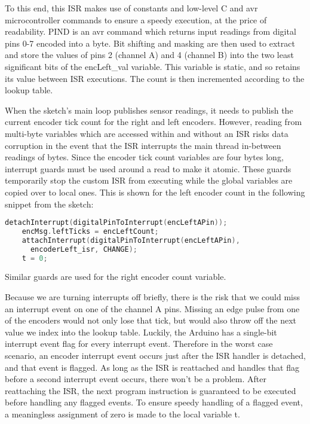 To this end, this ISR makes use of constants and low-level C and avr microcontroller commands to ensure a speedy execution, at the price of readability. PIND is an avr command which returns input readings from digital pins 0-7 encoded into a byte. Bit shifting and masking are then used to extract and store the values of pins 2 (channel A) and 4 (channel B) into the two least significant bits of the encLeft\_val variable. This variable is static, and so retains its value between ISR executions. The count is then incremented according to the lookup table.

When the sketch's main loop publishes sensor readings, it needs to publish the current encoder tick count for the right and left encoders. However, reading from multi-byte variables which are accessed within and without an ISR risks data corruption in the event that the ISR interrupts the main thread in-between readings of bytes. Since the encoder tick count variables are four bytes long, interrupt guards must be used around a read to make it atomic. These guards temporarily stop the custom ISR from executing while the global variables are copied over to local ones. This is shown for the left encoder count in the following snippet from the sketch:
\begin{mdframed}[backgroundcolor=light-gray, roundcorner=10pt,leftmargin=1, rightmargin=1, innerleftmargin=15, innertopmargin=15,innerbottommargin=15, outerlinewidth=1, linecolor=light-gray]
	\begin{lstlisting}[language=C++]
	detachInterrupt(digitalPinToInterrupt(encLeftAPin));
	encMsg.leftTicks = encLeftCount;
	attachInterrupt(digitalPinToInterrupt(encLeftAPin),
	  encoderLeft_isr, CHANGE);
	t = 0;
	\end{lstlisting}
\end{mdframed}

Similar guards are used for the right encoder count variable. 

Because we are turning interrupts off briefly, there is the risk that we could miss an interrupt event on one of the channel A pins. Missing an edge pulse from one of the encoders would not only lose that tick, but would also throw off the next value we index into the lookup table. Luckily, the Arduino has a single-bit interrupt event flag for every interrupt event. Therefore in the worst case scenario, an encoder interrupt event occurs just after the ISR handler is detached, and that event is flagged. As long as the ISR is reattached and handles that flag before a second interrupt event occurs, there won't be a problem. After reattaching the ISR, the next program instruction is guaranteed to be executed before handling any flagged events. To ensure speedy handling of a flagged event, a meaningless assignment of zero is made to the local variable t.

